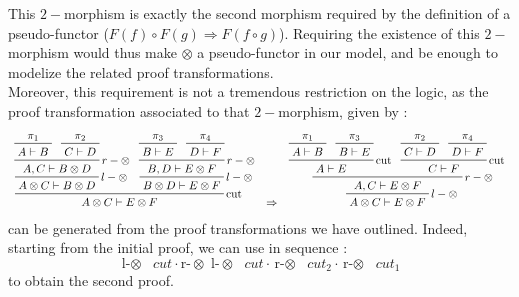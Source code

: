 \documentclass[a4paper, 12pt, twoside,openright]{report}
\begin{document}
This $2-$morphism is exactly the second morphism required by the definition of a pseudo-functor ($F(f) \circ F(g) \Rightarrow F(f \circ g)$). Requiring the existence of this $2-$morphism would thus make $\otimes$ a pseudo-functor in our model, and be enough to modelize the related proof transformations. \\ Moreover, this requirement is not a tremendous restriction on the logic, as the proof transformation associated to that $2-$morphism, given by : 
$$ \begin{array}{ccc}
 \prftree[r]{cut}
	{
		\prftree[r]{$l-\otimes$}
		{
			\prftree[r]{$r-\otimes$}
			{\prftree{\pi_1}{A\vdash B}}
			{\prftree{\pi_2}{C\vdash D}}
			{A , C \vdash B \otimes D}
		}
		{A \otimes C \vdash B \otimes D}
	}
	{
		\prftree[r]{$l-\otimes$}
		{
			\prftree[r]{$r-\otimes$}
			{\prftree{\pi_3}{B\vdash E}}
			{\prftree{\pi_4}{D\vdash F}}
			{B , D \vdash E \otimes F}
		}
		{B \otimes D \vdash E \otimes F}
	}
	{A \otimes C \vdash E \otimes F}
&
\Rightarrow
&
\prftree[r]{$l-\otimes$}
	{
		\prftree[r]{$r-\otimes$}
			{
				\prftree[r]{cut}
					{\prftree{\pi_1}{A\vdash B}}
					{\prftree{\pi_3}{B\vdash E}}
					{A \vdash E}
			}
			{
				\prftree[r]{cut}
					{\prftree{\pi_2}{C\vdash D}}
					{\prftree{\pi_4}{D\vdash F}}
					{C \vdash F}
			}
			{A , C \vdash E \otimes F}
	}
	{A \otimes C \vdash E \otimes F}
\end{array}
$$
can be generated from the proof transformations we have outlined. Indeed, starting from the initial proof, we can use in sequence : $$\text{l-$\otimes$ } cut
 \cdot \text{r-$\otimes$ l-$\otimes$ } cut  \cdot \text{r-$\otimes$ } cut_2 \cdot \text{r-$\otimes$ } cut_1$$ to obtain the second proof. \\
\end{document}
